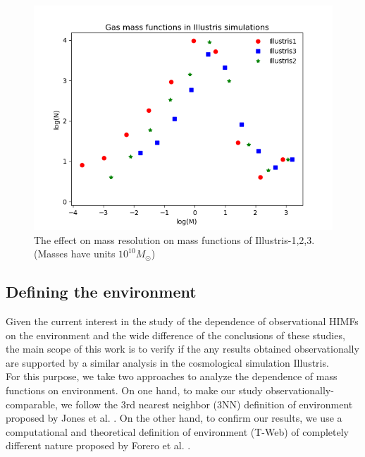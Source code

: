 \documentclass[a4paper,fleqn,usenatbib]{mnras}
\begin{document}
\begin{figure}
	\includegraphics[width=\columnwidth]{./pics/MassResolution.png}
    \caption{The effect on mass resolution on mass functions of Illustris-1,2,3. (Masses have units $10^{10}M_\odot$)} 
    \label{fig:resolution effects}
\end{figure}

 

\subsection{Defining the environment}

Given the current interest in the study of the dependence of observational HIMFs on the environment and the wide difference of the conclusions of these studies, the main scope of this work is to verify if the any results obtained observationally are supported by a similar analysis in the cosmological simulation Illustris.\\

For this purpose, we take two approaches to analyze the dependence of mass functions on environment. 
On one hand, to make our study observationally-comparable, we follow the 3rd nearest neighbor (3NN) definition of environment proposed by Jones et al. \cite{Jones2016}. 
On the other hand, to confirm our results, we use a computational and theoretical definition of environment (T-Web) of completely different nature proposed by Forero et al. \cite{Forero2009}. 
\end{document}
